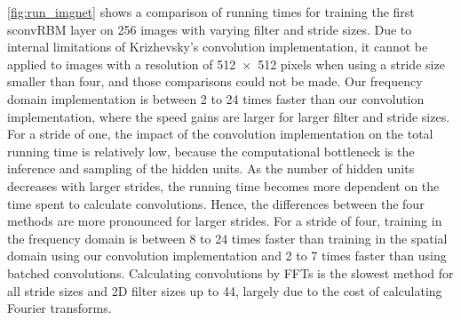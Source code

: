 \ref{fig:run_imgnet} shows a comparison of running
times for training the first sconvRBM layer on 256 images with varying filter
and stride sizes. Due to internal limitations of Krizhevsky's convolution
implementation, it cannot be applied to images with a resolution of
\num{512x512} pixels when using a stride size smaller than four, and those
comparisons could not be made. Our frequency domain implementation is between 2
to 24 times faster than our convolution implementation, where the speed gains
are larger for larger filter and stride sizes. For a stride of one, the impact
of the convolution implementation on the total running time is relatively low,
because the computational bottleneck is the inference and sampling of the hidden
units.
As the number of hidden units decreases with larger strides, the running time
becomes more dependent on the time spent to calculate convolutions.
Hence, the differences between the four methods are more pronounced for larger
strides. For a stride of four, training in the frequency domain is between 8 to
24 times faster than training in the spatial domain using our convolution
implementation and 2 to 7 times faster than using batched convolutions.
Calculating convolutions by FFTs is the slowest method for all stride sizes and
2D filter sizes up to 44, largely due to the cost of calculating Fourier
transforms.


